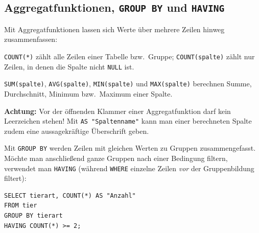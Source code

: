 \subsection{Aggregatfunktionen, \texttt{GROUP BY} und \texttt{HAVING}}

Mit Aggregatfunktionen lassen sich Werte über mehrere Zeilen hinweg
zusammenfassen:

\begin{compactitem}
  \item \lstinline|COUNT(*)| zählt alle Zeilen einer Tabelle bzw.\ Gruppe;
  \lstinline|COUNT(spalte)| zählt nur Zeilen, in denen die Spalte nicht
  \lstinline|NULL| ist.
  \item \lstinline|SUM(spalte)|, \lstinline|AVG(spalte)|, \lstinline|MIN(spalte)|
  und \lstinline|MAX(spalte)| berechnen Summe, Durchschnitt, Minimum bzw.\
  Maximum einer Spalte.
\end{compactitem}

\noindent \textbf{Achtung:} Vor der öffnenden Klammer einer Aggregatfunktion
darf kein Leerzeichen stehen! Mit \lstinline|AS "Spaltenname"| kann man einer
berechneten Spalte zudem eine aussagekräftige Überschrift geben.

Mit \lstinline|GROUP BY| werden Zeilen mit gleichen Werten zu Gruppen
zusammengefasst. Möchte man anschließend ganze Gruppen nach einer Bedingung
filtern, verwendet man \lstinline|HAVING| (während \lstinline|WHERE| einzelne
Zeilen \emph{vor} der Gruppenbildung filtert):

\begin{lstlisting}
SELECT tierart, COUNT(*) AS "Anzahl"
FROM tier
GROUP BY tierart
HAVING COUNT(*) >= 2;
\end{lstlisting}
